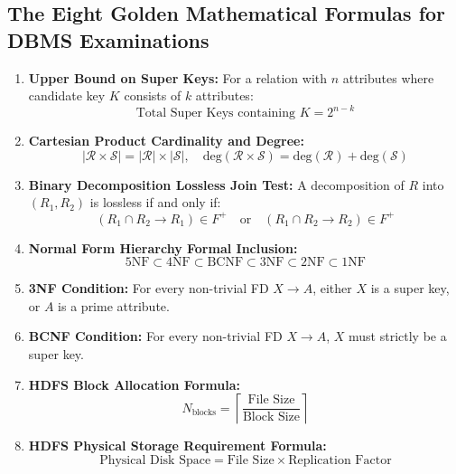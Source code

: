 \subsection{The Eight Golden Mathematical Formulas for DBMS Examinations}
\begin{enumerate}
    \item \textbf{Upper Bound on Super Keys:} For a relation with $n$ attributes where candidate key $K$ consists of $k$ attributes:
    \begin{equation}
    \text{Total Super Keys containing } K = 2^{n - k}
    \end{equation}
    \item \textbf{Cartesian Product Cardinality and Degree:}
    \begin{equation}
    |\mathcal{R} \times \mathcal{S}| = |\mathcal{R}| \times |\mathcal{S}|, \quad \text{deg}(\mathcal{R} \times \mathcal{S}) = \text{deg}(\mathcal{R}) + \text{deg}(\mathcal{S})
    \end{equation}
    \item \textbf{Binary Decomposition Lossless Join Test:} A decomposition of $R$ into $(R_1, R_2)$ is lossless if and only if:
    \begin{equation}
    (R_1 \cap R_2 \to R_1) \in F^+ \quad \text{or} \quad (R_1 \cap R_2 \to R_2) \in F^+
    \end{equation}
    \item \textbf{Normal Form Hierarchy Formal Inclusion:}
    \begin{equation}
    5\text{NF} \subset 4\text{NF} \subset \text{BCNF} \subset 3\text{NF} \subset 2\text{NF} \subset 1\text{NF}
    \end{equation}
    \item \textbf{3NF Condition:} For every non-trivial FD $X \to A$, either $X$ is a super key, or $A$ is a prime attribute.
    \item \textbf{BCNF Condition:} For every non-trivial FD $X \to A$, $X$ must strictly be a super key.
    \item \textbf{HDFS Block Allocation Formula:}
    \begin{equation}
    N_{\text{blocks}} = \left\lceil \frac{\text{File Size}}{\text{Block Size}} \right\rceil
    \end{equation}
    \item \textbf{HDFS Physical Storage Requirement Formula:}
    \begin{equation}
    \text{Physical Disk Space} = \text{File Size} \times \text{Replication Factor}
    \end{equation}
\end{enumerate}

